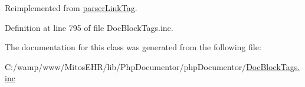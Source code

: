 \-Reimplemented from \hyperlink{classparser_link_tag_a4a925d6b38bcf3957c713a7d3dc7da1f}{parser\-Link\-Tag}.



\-Definition at line 795 of file \-Doc\-Block\-Tags.\-inc.



\-The documentation for this class was generated from the following file\-:\begin{DoxyCompactItemize}
\item 
\-C\-:/wamp/www/\-Mitos\-E\-H\-R/lib/\-Php\-Documentor/php\-Documentor/\hyperlink{_doc_block_tags_8inc}{\-Doc\-Block\-Tags.\-inc}\end{DoxyCompactItemize}
